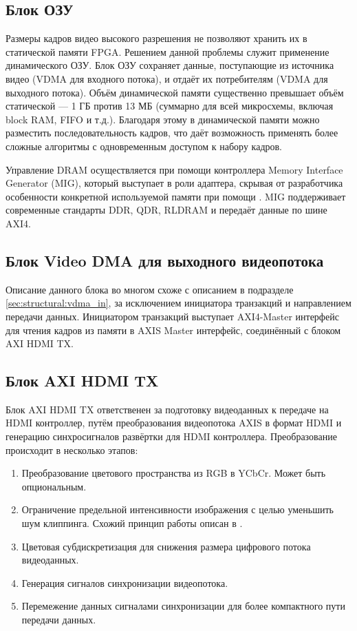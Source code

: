 \subsection{Блок ОЗУ}
\label{sec:structural:ram}
Размеры кадров видео высокого разрешения не позволяют хранить их в статической памяти FPGA. Решением данной проблемы
служит применение динамического ОЗУ. Блок ОЗУ сохраняет данные, поступающие из источника видео (VDMA для входного потока), и отдаёт
их потребителям (VDMA для выходного потока). Объём динамической памяти существенно превышает объём статической ---
1 ГБ против 13 МБ (суммарно для всей микросхемы, включая block RAM, FIFO и т.д.). Благодаря этому в динамической памяти можно разместить
последовательность кадров, что даёт возможность применять более сложные алгоритмы с одновременным доступом к набору кадров.

Управление DRAM осуществляется при помощи контроллера Memory Interface Generator (MIG), который выступает в роли адаптера, скрывая
от разработчика особенности конкретной используемой памяти при помощи . MIG поддерживает современные
стандарты DDR, QDR, RLDRAM и передаёт данные по шине AXI4.

\subsection{Блок Video DMA для выходного видеопотока}
\label{sec:structural:vdma_out}
Описание данного блока во многом схоже с описанием в подразделе \ref{sec:structural:vdma_in},
за исключением инициатора транзакций и направлением передачи данных. Инициатором транзакций выступает
AXI4-Master интерфейс для чтения кадров из памяти в AXIS Master интерфейс, соединённый с блоком AXI HDMI TX.

\subsection{Блок AXI HDMI TX}
\label{sec:structural:axi_hdmi_tx}
Блок AXI HDMI TX ответственен за подготовку видеоданных к передаче на HDMI контроллер, путём
преобразования видеопотока AXIS в формат HDMI и генерацию синхросигналов развёртки для HDMI контроллера.
Преобразование происходит в несколько этапов:
\begin{enumerate}[label={\arabic*}]
  \item Преобразование цветового пространства из RGB в YCbCr. Может быть опциональным.
  \item Ограничение предельной интенсивности изображения с целью уменьшить шум клиппинга.
    Схожий принцип работы описан в \cite{ycbcr_to_rgb_converter}.
  \item Цветовая субдискретизация для снижения размера цифрового потока видеоданных.
  \item Генерация сигналов синхронизации видеопотока.
  \item Перемежение данных сигналами синхронизации для более компактного пути передачи данных.
  \end{enumerate}

